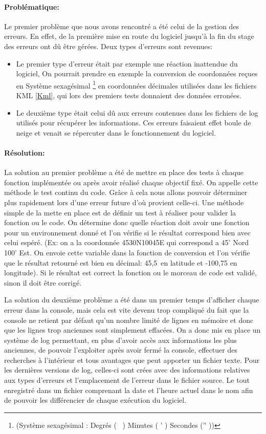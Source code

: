             \paragraph{Problématique:}
Le premier problème que nous avons rencontré a été celui de la gestion des erreurs. En effet, de la première mise en route du logiciel jusqu'à la fin du stage des erreurs ont dû être gérées. Deux types d'erreurs sont revenues:
\begin{itemize}
    \item Le premier type d'erreur était par exemple une réaction inattendue du logiciel, On pourrait prendre en exemple la conversion de coordonnées reçues en Système sexagésimal \footnote{(Système sexagésimal : Degrés ( \degres\ ) Minutes ( ' ) Secondes ('' ))} en coordonnées décimales utilisées dans les fichiers KML \vref{Kml}, qui lors des premiers tests donnaient des données erronées.
    \item Le deuxième type était celui dû aux erreurs contenues dans les fichiers de log utilisés pour récupérer les informations. Ces erreurs faisaient effet boule de neige et venait se répercuter dans le fonctionnement du logiciel.
\end{itemize}\medskip

            \paragraph{Résolution:}
La solution au premier problème a été de mettre en place des tests à chaque fonction implémentée ou après avoir réalisé chaque objectif fixé. On appelle cette méthode le test continu du code. Grâce à cela nous allons pouvoir déterminer plus rapidement lors d'une erreur future d'où provient celle-ci. Une méthode simple de la mette en place est de définir un test à réaliser pour valider la fonction ou le code. On détermine donc quelle réaction doit avoir une fonction pour un environnement donné et l'on vérifie si le résultat correspond bien avec celui espéré. (Ex: on a la coordonnée 4530N10045E qui correspond a 45' Nord 100' Est. On envoie cette variable dans la fonction de conversion et l'on vérifie que le résultat retourné est bien en décimal: 45,5\degres\ en latitude et -100,75 en longitude). Si le résultat est correct la fonction ou le morceau de code est validé, sinon il doit être corrigé.

La solution du deuxième problème a été dans un premier temps d'afficher chaque erreur dans la console, mais cela est vite devenu trop compliqué du fait que la console ne retient par défaut qu'un nombre limité de lignes en mémoire et donc que les lignes trop anciennes sont simplement effacées. On a donc mis en place un système de log permettant, en plus d'avoir accès aux informations les plus anciennes, de pouvoir l'exploiter après avoir fermé la console, effectuer des recherches à l'intérieur et tous avantages que peut apporter un fichier texte. Pour les dernières versions de log, celles-ci sont crées avec des informations relatives aux types d'erreurs et l'emplacement de l'erreur dans le fichier source. Le tout enregistré dans un fichier comprenant la date et l'heure actuel dans le nom afin de pouvoir les différencier de chaque exécution du logiciel. 

